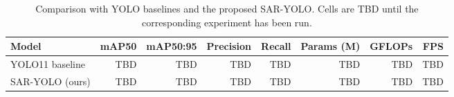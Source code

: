 \begin{table}[t]
\centering
\caption{Comparison with YOLO baselines and the proposed SAR-YOLO. Cells are TBD until the corresponding experiment has been run.}
\label{tab:baseline_comparison}
\begin{tabular}{lrrrrrrr}
\toprule
Model & mAP50 & mAP50:95 & Precision & Recall & Params (M) & GFLOPs & FPS \\
\midrule
YOLO11 baseline & TBD & TBD & TBD & TBD & TBD & TBD & TBD \\
SAR-YOLO (ours) & TBD & TBD & TBD & TBD & TBD & TBD & TBD \\
\bottomrule
\end{tabular}
\end{table}
